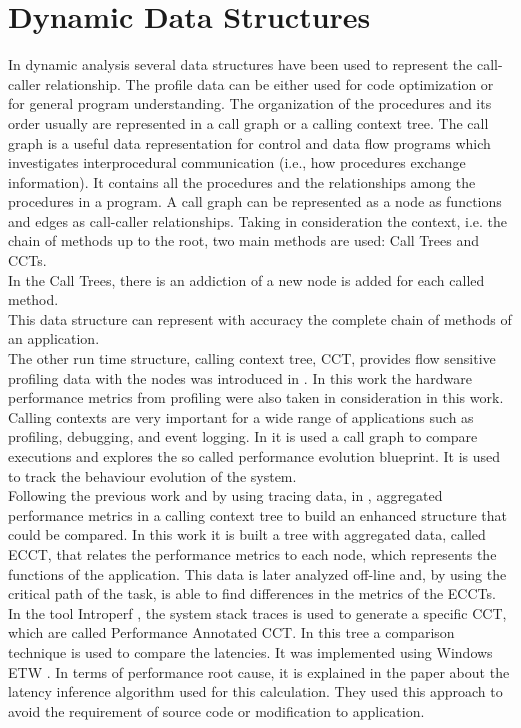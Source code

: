 \section{Dynamic Data Structures}
In dynamic analysis several data structures have been used to represent the call-caller relationship. The profile data can be either used for code optimization or for general program understanding. The organization of the procedures and its order usually are represented in a call graph or a calling context tree.
The call graph is a useful data representation for control and data flow programs which investigates interprocedural communication (i.e., how procedures exchange information). It contains all the procedures and the relationships among the procedures in a program. A call graph can be represented as a node as functions and edges as call-caller relationships. 
Taking in consideration the context, i.e. the chain of methods up to the root, two main methods are used: Call Trees and CCTs.\\
In the Call Trees, there is an addiction of a new node is added for each called method. \\
This data structure can represent with accuracy the complete chain of methods of an application. \\
The other run time structure, calling context tree, CCT, provides flow sensitive profiling data with the nodes was introduced in \cite{blueprint}. In this work the hardware performance metrics from profiling were also taken in consideration in this work. Calling contexts are very important for a wide range of applications such as profiling, debugging, and event logging.  In \cite{blueprint} it is used a call graph to compare executions and explores the so called  performance evolution blueprint.  It is used to track the behaviour evolution of the system.\\
Following the previous work and by using tracing data, in \cite{doray_article}, aggregated performance metrics in a calling context tree to build an enhanced structure that could be compared. In this work it is built a tree with aggregated data, called ECCT, that relates the performance metrics to each node, which represents the functions of the application. This data is later analyzed off-line and, by using the critical path of the task, is able to find differences in the metrics of the ECCTs.\\
In the tool Introperf \cite{Introperf}, the system stack traces is used to generate a specific CCT, which are called Performance Annotated CCT. In this tree a comparison technique is used to compare the latencies. It was implemented using Windows ETW \cite{ETW}. In terms of performance root cause, it is explained in the paper about the latency inference algorithm used for this calculation. They used this approach to avoid the requirement of source code or modification to application.\\
